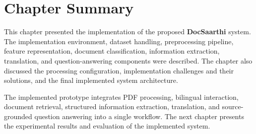\section*{Chapter Summary}

This chapter presented the implementation of the proposed
\textbf{DocSaarthi} system. The implementation environment, dataset
handling, preprocessing pipeline, feature representation, document
classification, information extraction, translation, and
question-answering components were described. The chapter also
discussed the processing configuration, implementation challenges and
their solutions, and the final implemented system architecture.

The implemented prototype integrates PDF processing, bilingual
interaction, document retrieval, structured information extraction,
translation, and source-grounded question answering into a single
workflow. The next chapter presents the experimental results and
evaluation of the implemented system.

